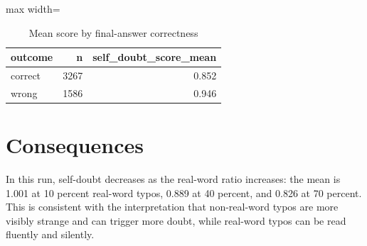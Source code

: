 \documentclass[11pt]{article}
\begin{document}
\begin{table}[H]
\centering
\caption{Mean score by final-answer correctness}
\small
\begin{adjustbox}{max width=\textwidth}
\begin{tabular}{lrr}
\toprule
\textbf{outcome} & \textbf{n} & \textbf{self\_doubt\_score\_mean} \\
\midrule
correct & 3267 & 0.852 \\
wrong & 1586 & 0.946 \\
\bottomrule
\end{tabular}
\end{adjustbox}
\end{table}

\section*{Consequences} In this run, self-doubt decreases as the real-word ratio increases: the mean is 1.001 at 10 percent real-word typos, 0.889 at 40 percent, and 0.826 at 70 percent. This is consistent with the interpretation that non-real-word typos are more visibly strange and can trigger more doubt, while real-word typos can be read fluently and silently.
\end{document}
